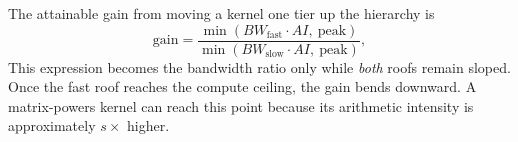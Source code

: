 The attainable gain from moving a kernel one tier up the hierarchy is
\begin{equation}
\text{gain} = \frac{\min(BW_{\text{fast}} \cdot AI,\ \text{peak})} {\min(BW_{\text{slow}} \cdot AI,\ \text{peak})},
\label{eq:gain}
\end{equation}
This expression becomes the bandwidth ratio only while \emph{both} roofs remain sloped. Once the fast roof reaches the compute ceiling, the gain bends downward. A matrix-powers kernel can reach this point because its arithmetic intensity is approximately $s\times$ higher.
